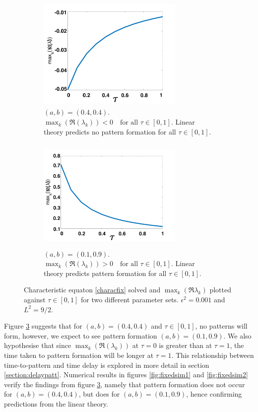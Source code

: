 \begin{figure}[H]
    \centering
    \begin{subfigure}[b]{0.45\textwidth}
        \centering
        \includegraphics[width=7cm,height = 5.5cm]{disp1.png}
        \caption{$(a,b)=(0.4,0.4)$. $\max_k(\Re(\lambda_k))<0 \quad \text{for all }\tau\in[0,1]$. Linear theory predicts no pattern formation for all $\tau\in[0,1]$. }
        \label{}
    \end{subfigure}
    \hfill
    \begin{subfigure}[b]{0.45\textwidth}
        \centering
        \includegraphics[width=7cm,height = 5.5cm]{disp2.png}
        \caption{$(a,b)=(0.1,0.9)$. $\max_k(\Re(\lambda_k))>0 \quad \text{for all }\tau\in[0,1]$. Linear theory predicts pattern formation for all $\tau\in[0, 1]$.}
        \label{}
    \end{subfigure}
    \caption{Characteristic equaton \eqref{characfix} solved and $\max_k(\Re{\lambda_k})$ plotted against $\tau\in[0,1]$ for two different parameter sets. $\epsilon^2=0.001$ and $L^2=9/2$.}
    \label{fig:dispfixed}
\end{figure}
Figure \ref{fig:dispfixed} suggests that for $(a,b)=(0.4,0.4)$ and $\tau\in[0,1]$, no patterns will form, however, we expect to see pattern formation $(a,b)=(0.1,0.9)$. We also hypothesise that since $\max_k(\Re(\lambda_k))$ at $\tau=0$ is greater than at $\tau=1$, the time taken to pattern formation will be longer at $\tau=1$. This relationship between time-to-pattern and time delay is explored in more detail in section \ref{section:delaypatt}. Numerical results in figures \ref{fig:fixedsim1} and \ref{fig:fixedsim2} verify the findings from figure \ref{fig:dispfixed}, namely that pattern formation does not occur for $(a,b)=(0.4,0.4)$, but does for $(a,b)=(0.1,0.9)$, hence confirming predictions from the linear theory.

